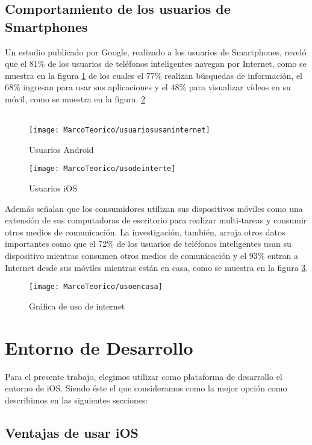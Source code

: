 	\subsection{Comportamiento de los usuarios de Smartphones}
	Un estudio publicado por Google, realizado a los usuarios de Smartphones, reveló que el 81\% de los usuarios de teléfonos inteligentes navegan por Internet,  como se muestra en la figura \ref{fig:grafica1usodeinternet} de los cuales el 77\% realizan búsquedas de información, el 68\% ingresan para usar sus aplicaciones y el 48\% para visualizar vídeos en su móvil, como se muestra en la figura. \ref{fig:grafica2usodeinternet}\\ \\
	\begin{figure}[ht]
		\centering
		\caption{Usuarios Android}
		\label{fig:grafica1usodeinternet}
		\texttt{[image: MarcoTeorico/usuariosusaninternet]}
	\end{figure}
	\begin{figure}[ht]
		\centering
		\caption{Usuarios iOS}
		\label{fig:grafica2usodeinternet}
		\texttt{[image: MarcoTeorico/usodeinterte]}
	\end{figure}
	Además señalan que los consumidores utilizan sus dispositivos móviles como una extensión de sus computadoras de escritorio para realizar multi-tareas y consumir otros medios de comunicación. La investigación, también, arroja otros datos importantes como que el 72\% de los usuarios de teléfonos inteligentes usan su dispositivo mientras consumen otros medios de comunicación y el 93\% entran a Internet desde sus móviles mientras están en casa, como se muestra en la figura  \ref{fig:grafica3usodeinternet}. \cite{09} \\
	\begin{figure}[ht]
		\centering
		\caption{Gráfica de uso de internet}
		\label{fig:grafica3usodeinternet}
		\texttt{[image: MarcoTeorico/usoencasa]}
	\end{figure}
	
	\section{Entorno de Desarrollo}
	
		Para el presente trabajo, elegimos utilizar como plataforma de desarrollo el entorno de iOS. Siendo éste el que consideramos como la mejor opción como describimos en las siguientes secciones:
		
	\subsection{Ventajas de usar iOS}

